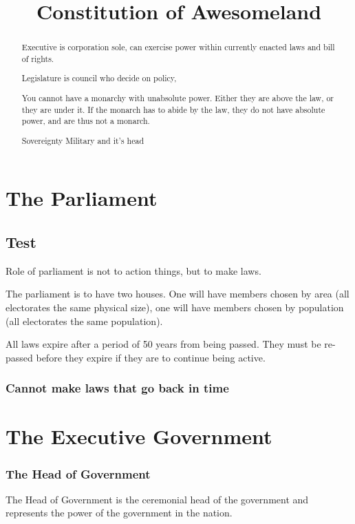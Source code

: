 \documentclass[a4paper]{report}
\title{Constitution of Awesomeland}
\author{}
\begin{document}
\maketitle

\begin{abstract}
	
	Executive is corporation sole, can exercise power within currently enacted laws and bill of rights.
	
	Legislature is council who decide on policy, 
	
	You cannot have a monarchy with unabsolute power. Either they are above the law, or they are under it.
	If the monarch has to abide by the law, they do not have absolute power, and are thus not a monarch.
	
	Sovereignty
	Military and it's head

\end{abstract}

\chapter{The Parliament}

\section{Test}

Role of parliament is not to action things, but to make laws.

The parliament is to have two houses. One will have members chosen by area (all electorates the same physical size), one will have members chosen by population (all electorates the same population).

All laws expire after a period of 50 years from being passed. They must be re-passed before they expire if they are to continue being active.


\subsection{Cannot make laws that go back in time}

\chapter{The Executive Government}

\subsection{The Head of Government}
The Head of Government is the ceremonial head of the government and represents the power of the government in the nation. 
\end{document}

